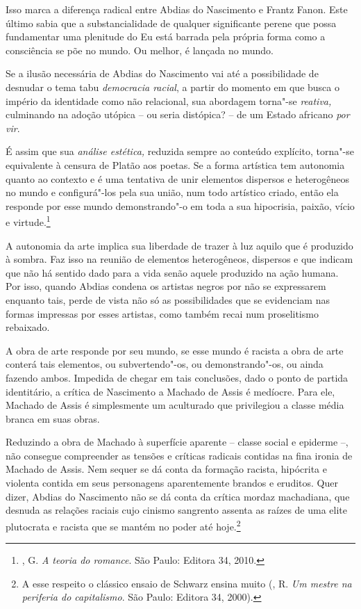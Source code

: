 Isso marca a diferença radical entre Abdias do Nascimento e Frantz
Fanon. Este último sabia que a substancialidade de qualquer significante
perene que possa fundamentar uma plenitude do Eu está barrada pela
própria forma como a consciência se põe no mundo. Ou melhor, é lançada
no mundo.

Se a ilusão necessária de Abdias do Nascimento vai até a possibilidade
de desnudar o tema tabu \emph{democracia racial}, a partir do momento em
que busca o império da identidade como não relacional, sua abordagem
torna"-se \emph{reativa,} culminando na adoção utópica -- ou seria
distópica? -- de um Estado africano \emph{por vir}.

É assim que sua \emph{análise estética,} reduzida sempre ao conteúdo
explícito, torna"-se equivalente à censura de Platão aos poetas. Se a
forma artística tem autonomia quanto ao contexto e é uma tentativa de
unir elementos dispersos e heterogêneos no mundo e configurá"-los pela
sua união, num todo artístico criado, então ela responde por esse mundo
demonstrando"-o em toda a sua hipocrisia, paixão, vício e
virtude.\footnote{, G. \emph{A teoria do romance}. São Paulo:
  Editora 34, 2010.}

A autonomia da arte implica sua liberdade de trazer à luz aquilo que é
produzido à sombra. Faz isso na reunião de elementos heterogêneos,
dispersos e que indicam que não há sentido dado para a vida senão aquele
produzido na ação humana. Por isso, quando Abdias condena os artistas
negros por não se expressarem enquanto tais, perde de vista não só as
possibilidades que se evidenciam nas formas impressas por esses
artistas, como também recai num proselitismo rebaixado.

A obra de arte responde por seu mundo, se esse mundo é racista a obra de
arte conterá tais elementos, ou subvertendo"-os, ou demonstrando"-os, ou
ainda fazendo ambos. Impedida de chegar em tais conclusões, dado o ponto
de partida identitário, a crítica de Nascimento a Machado de Assis é
medíocre. Para ele, Machado de Assis é simplesmente um aculturado que
privilegiou a classe média branca em suas obras.

Reduzindo a obra de Machado à superfície aparente -- classe social e
epiderme --, não consegue compreender as tensões e críticas radicais
contidas na fina ironia de Machado de Assis. Nem sequer se dá conta da
formação racista, hipócrita e violenta contida em seus personagens
aparentemente brandos e eruditos. Quer dizer, Abdias do Nascimento não
se dá conta da crítica mordaz machadiana, que desnuda as relações
raciais cujo cinismo sangrento assenta as raízes de uma elite plutocrata
e racista que se mantém no poder até hoje.\footnote{A esse respeito o
  clássico ensaio de Schwarz ensina muito (, R. \emph{Um mestre
  na periferia do capitalismo}. São Paulo: Editora 34, 2000).}

